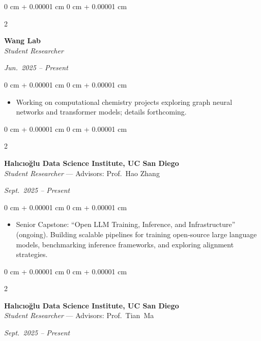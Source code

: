 \documentclass[10pt, letterpaper]{article}
\newenvironment{highlights}{
    \begin{itemize}[
        topsep=0.10 cm,
        parsep=0.10 cm,
        partopsep=0pt,
        itemsep=0pt,
        leftmargin=0 cm + 10pt
    ]
}{
    \end{itemize}
} %
\newenvironment{onecolentry}{
    \begin{adjustwidth}{
        0 cm + 0.00001 cm
    }{
        0 cm + 0.00001 cm
    }
}{
    \end{adjustwidth}
} %
\newenvironment{twocolentry}[2][]{
    \onecolentry
    \def\secondColumn{#2}
    \setcolumnwidth{\fill, 4.5 cm}
    \begin{paracol}{2}
}{
    \switchcolumn \raggedleft \secondColumn
    \end{paracol}
    \endonecolentry
} %
\begin{document}
    \vspace{0.20 cm}

    \begin{twocolentry}{\textit{Jun.\@ 2025 – Present}}
        \textbf{Wang Lab} \\
        \textit{Student Researcher}
    \end{twocolentry}

    \vspace{0.10 cm}
    \begin{onecolentry}
        \begin{highlights}
            \item Working on computational chemistry projects exploring graph neural networks and transformer models; details forthcoming.
        \end{highlights}
    \end{onecolentry}

    \vspace{0.20 cm}

    \begin{twocolentry}{\textit{Sept.\@ 2025 – Present}}
        \textbf{Halıcıo\u{g}lu Data Science Institute, UC San Diego} \\
        \textit{Student Researcher} — Advisors: Prof.~Hao Zhang
    \end{twocolentry}

    \vspace{0.10 cm}
    \begin{onecolentry}
        \begin{highlights}
            \item Senior Capstone: “Open LLM Training, Inference, and Infrastructure” (ongoing). Building scalable pipelines for training open‑source large language models, benchmarking inference frameworks, and exploring alignment strategies.
        \end{highlights}
    \end{onecolentry}

    \vspace{0.20 cm}

    \begin{twocolentry}{\textit{Sept.\@ 2025 – Present}}
        \textbf{Halıcıo\u{g}lu Data Science Institute, UC San Diego} \\
        \textit{Student Researcher} — Advisors: Prof.~Tian Ma
    \end{twocolentry}
\end{document}
